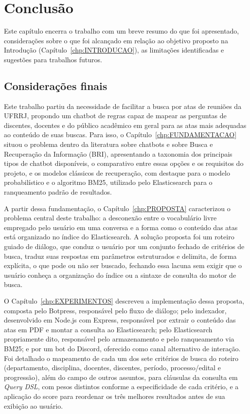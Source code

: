 \chapter{Conclusão}\label{chp:CONCLUSAO}

Este capítulo encerra o trabalho com um breve resumo do que foi apresentado, considerações sobre o que foi alcançado em relação ao objetivo proposto na Introdução (Capítulo~\ref{chp:INTRODUCAO}), as limitações identificadas e sugestões para trabalhos futuros.

\section{Considerações finais}

Este trabalho partiu da necessidade de facilitar a busca por atas de reuniões da UFRRJ, propondo um chatbot de regras capaz de mapear as perguntas de discentes, docentes e do público acadêmico em geral para as atas mais adequadas ao conteúdo de suas buscas. Para isso, o Capítulo~\ref{chp:FUNDAMENTACAO} situou o problema dentro da literatura sobre chatbots e sobre Busca e Recuperação da Informação (BRI), apresentando a taxonomia dos principais tipos de chatbot disponíveis, o comparativo entre essas opções e os requisitos do projeto, e os modelos clássicos de recuperação, com destaque para o modelo probabilístico e o algoritmo BM25, utilizado pelo Elasticsearch para o ranqueamento padrão de resultados.

A partir dessa fundamentação, o Capítulo~\ref{chp:PROPOSTA} caracterizou o problema central deste trabalho: a desconexão entre o vocabulário livre empregado pelo usuário em uma conversa e a forma como o conteúdo das atas está organizado no índice do Elasticsearch. A solução proposta foi um roteiro guiado de diálogo, que conduz o usuário por um conjunto fechado de critérios de busca, traduz suas respostas em parâmetros estruturados e delimita, de forma explícita, o que pode ou não ser buscado, fechando essa lacuna sem exigir que o usuário conheça a organização do índice ou a sintaxe de consulta do motor de busca.

O Capítulo~\ref{chp:EXPERIMENTOS} descreveu a implementação dessa proposta, composta pelo Botpress, responsável pelo fluxo de diálogo; pelo indexador, desenvolvido em Node.js com Express, responsável por extrair o conteúdo das atas em PDF e montar a consulta ao Elasticsearch; pelo Elasticsearch propriamente dito, responsável pelo armazenamento e pelo ranqueamento via BM25; e por um bot do Discord, oferecido como canal alternativo de interação. Foi detalhado o mapeamento de cada um dos sete critérios de busca do roteiro (departamento, disciplina, docentes, discentes, período, processo/edital e progressão), além do campo de outros assuntos, para cláusulas da consulta em \textit{Query DSL}, com pesos distintos conforme a especificidade de cada critério, e a aplicação do score para reordenar os três melhores resultados antes de sua exibição ao usuário.

